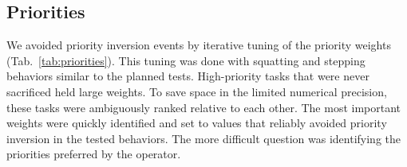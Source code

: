 \documentclass[utf8]{frontiersSCNS}
\newcommand{\add}[1]{\textcolor[HTML]{8710b3}{#1}}
\begin{document}

\subsection{Priorities}

\add{We avoided priority inversion events by iterative tuning of the priority weights (Tab.~\ref{tab:priorities}). This tuning was done with squatting and stepping behaviors similar to the planned tests. High-priority tasks that were never sacrificed held large weights. To save space in the limited numerical precision, these tasks were ambiguously ranked relative to each other. The most important weights were quickly identified and set to values that reliably avoided priority inversion in the tested behaviors. The more difficult question was identifying the priorities preferred by the operator.}
\end{document}
